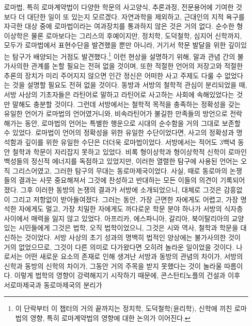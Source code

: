 로마법, 특히 로마계약법이
다양한 학문의
사고양식, 추론과정, 전문용어에 기여한 것보다
더 대단한 일이 또 있는지 모르겠다.
자연과학을 제외하고,
근대인의 지적 욕구를 자극한 대상 중에
로마법이라는 여과장치를 통과하지 않은 것은 거의 없다.
순수한 형이상학은 물론 로마보다는 그리스의 후예이지만,
정치학, 도덕철학, 심지어 신학까지,
모두가 로마법에서 표현수단을 발견했을 뿐만 아니라,
거기서 학문 발달을 위한 깊이있는 탐구가 배양되는 거점도 발견했다.\footnote{%
  이 단락부터 이 챕터의 거의 끝까지는
  정치학, 도덕철학(윤리학), 신학에 끼친
  로마법의 영향, 특히 로마계약법의 영향에 대한 논의가 이어진다.
  }
이런 현상을 설명하기 위해,
말과 관념 간의 불가사의한 관계를 논할 필요는 전혀 없을 것이며,
또한
적절한 언어의 저장고와 적절한 추론의 장치가 미리 주어지지 않으면
인간 정신은 어떠한 사고 주제도 다룰 수 없었다는 것을 설명할
필요도 전혀 없을 것이다.
동방과 서방의 철학적 관심이 분리되었을 때,
서방 사상의 기초자들은 라틴어로 말하고 라틴어로 사고하는 사회에
속해있었다는 것만 말해도 충분할 것이다.
그런데
서방에서는
철학적 목적을 충족하는 정확성을 갖는 유일한 언어가
로마법의 언어였거니와,
비속라틴어가 불길한 만족들의 방언으로 전락해가는 동안,
로마법의 언어는 특별한 행운으로
 시대의 순수함을 거의 그대로 보존할 수 있었다.
로마법이 언어의 정확성을 위한 유일한 수단이었다면,
사고의 정확성과 명석함과 깊이를 위한 유일한 수단은 더더욱 로마법이었다.
서방에서는
적어도 3백녁 동안 철학과 학문이 자리잡지 못하고 있었다.
비록 형이상학과 형이상학적 신학이 로마인 백성들의 정신적 에너지를
독점하고 있었지만,
이러한 열렬한 탐구에 사용된 언어는 오직 그리스어였고,
그러한 탐구의 무대는 동로마제국이었다.
사실,
때로 동로마의 논쟁들의 결과는 사뭇 중요해져서
그것에 찬성하고 반대하는 모든 이들의 의견이 기록되어졌다.
그후 이러한 동방의 논쟁의 결과가 서방에 소개되었으니,
대체로 그것은
감흥없이 그리고 저항없이 받아들여졌다.
그러는 동안,
가장 근면한 자에게도 어렵고,
가장 명석한 자에게도 멀고,
가장 치밀한 자에게도 까다로운
학문 분야 하나가 서방의 식자층 사이에서
매력을 잃지 않고 있었다.
아프리카, 에스파니아, 갈리아, 북이탈리아의 교양있는 시민들에게
그것은 법학, 오직 법학이었으니,
그것은 시와 역사, 철학과 학문을 대신하는 것이었다.
서방 사상의 초기 성과의 명백히 법적인 양상에는
불가사의한 것이 거의 없었으므로,
그것이 다른 의미로 다가왔다면 오히려 놀라운 일이었을 것이다.
나로서는
어떤 새로운 요소의 존재로 인해 생겨난
서방과 동방의 관념의 차이가,
서방의 신학과 동방의 신학의 차이가,
그동안 거의 주목을 받지 못했다는 것이
놀라울 따름이다.
이렇게 법학의 영향이 강력해지기 시작하기 때문에,
콘스탄티노플의 건설과 이후 서로마제국과 동로마제국의 분리가
